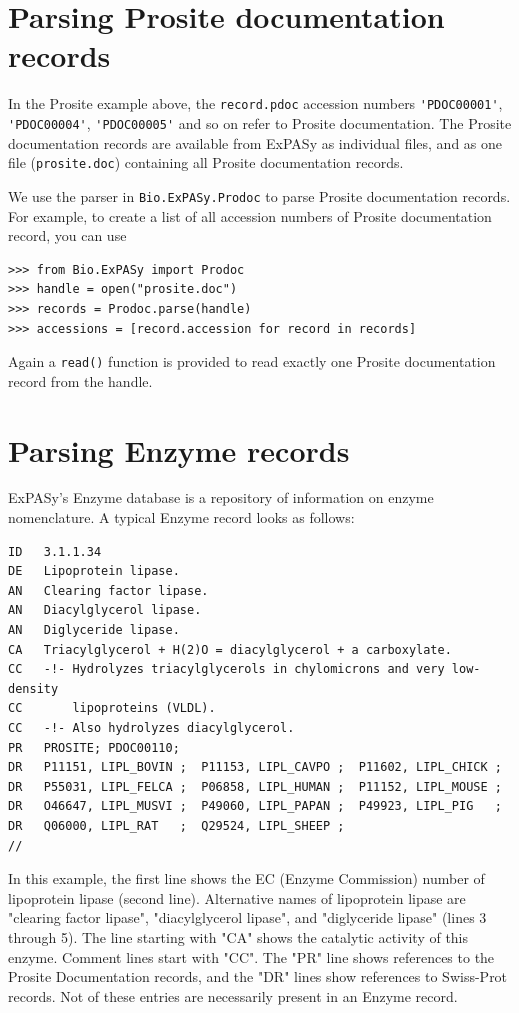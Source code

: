 \documentclass{report}
\begin{document}
\section{Parsing Prosite documentation records}

In the Prosite example above, the \verb|record.pdoc| accession numbers \verb|'PDOC00001'|, \verb|'PDOC00004'|, \verb|'PDOC00005'| and so on refer to Prosite documentation. The Prosite documentation records are available from ExPASy as individual files, and as one file (\verb|prosite.doc|) containing all Prosite documentation records.

We use the parser in \verb|Bio.ExPASy.Prodoc| to parse Prosite documentation records. For example, to create a list of all accession numbers of Prosite documentation record, you can use

\begin{verbatim}
>>> from Bio.ExPASy import Prodoc
>>> handle = open("prosite.doc")
>>> records = Prodoc.parse(handle)
>>> accessions = [record.accession for record in records]
\end{verbatim}

Again a \verb|read()| function is provided to read exactly one Prosite documentation record from the handle.

\section{Parsing Enzyme records}

ExPASy's Enzyme database is a repository of information on enzyme nomenclature. A typical Enzyme record looks as follows:

\begin{verbatim}
ID   3.1.1.34
DE   Lipoprotein lipase.
AN   Clearing factor lipase.
AN   Diacylglycerol lipase.
AN   Diglyceride lipase.
CA   Triacylglycerol + H(2)O = diacylglycerol + a carboxylate.
CC   -!- Hydrolyzes triacylglycerols in chylomicrons and very low-density
CC       lipoproteins (VLDL).
CC   -!- Also hydrolyzes diacylglycerol.
PR   PROSITE; PDOC00110;
DR   P11151, LIPL_BOVIN ;  P11153, LIPL_CAVPO ;  P11602, LIPL_CHICK ;
DR   P55031, LIPL_FELCA ;  P06858, LIPL_HUMAN ;  P11152, LIPL_MOUSE ;
DR   O46647, LIPL_MUSVI ;  P49060, LIPL_PAPAN ;  P49923, LIPL_PIG   ;
DR   Q06000, LIPL_RAT   ;  Q29524, LIPL_SHEEP ;
//
\end{verbatim}

In this example, the first line shows the EC (Enzyme Commission) number of lipoprotein lipase (second line). Alternative names of lipoprotein lipase are "clearing factor lipase", "diacylglycerol lipase", and "diglyceride lipase" (lines 3 through 5). The line starting with "CA" shows the catalytic activity of this enzyme. Comment lines start with "CC". The "PR" line shows references to the Prosite Documentation records, and the "DR" lines show references to Swiss-Prot records. Not of these entries are necessarily present in an Enzyme record.
\end{document}
